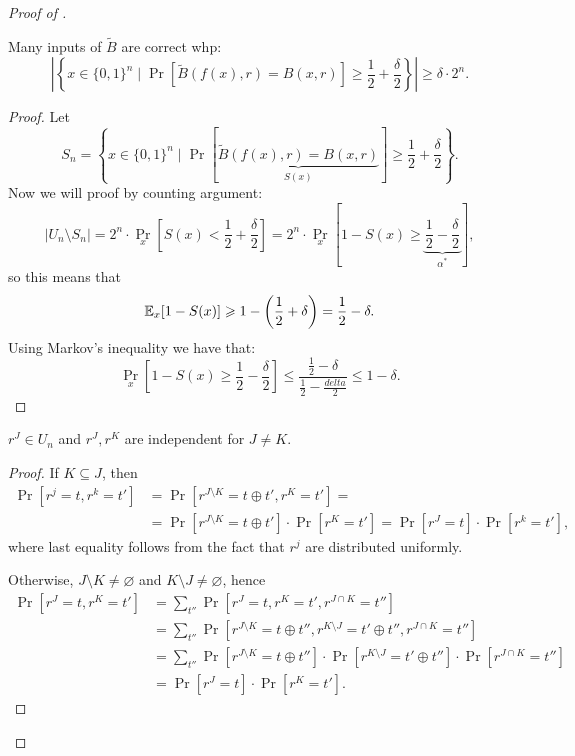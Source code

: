 \begin{proof}[Proof of ]
   \begin{lemma}
    Many inputs of $\tilde B$ are correct whp:
	 \[
		 \left|\left\{x \in \{0,1\}^n \mid \Pr[\tilde B(f(x), r) = B(x, r)] \geq \frac{1}{2} + \frac{\delta}{2}\right\}\right| \geq \delta \cdot 2^n.
	\] 
  \end{lemma}
  \begin{proof}
	  Let 
	  \[
		  S_n = \left\{x \in \{0,1\}^n \mid \Pr\left[\underbrace{\tilde B(f(x), r) = B(x, r)}_{S(x)}\right] \geq \frac{1}{2} + \frac{\delta}{2}\right\}.
	  \] 
	  Now we will proof by counting argument:
    \[
		|U_n \setminus S_n| = 2 ^{n} \cdot \Pr_x \left[S(x) < \frac{1}{2} + \frac{\delta}{2}\right] = 2^{n} \cdot \Pr_x \left[1 - S(x) \geq \underbrace{\frac{1}{2} - \frac{\delta}{2}}_{\alpha^*}\right],
    \] 
	so this means that
	\[
		\mathbb{E}_x[1 - S(x)] \geqslant 1 - \left(\frac{1}{2} + \delta\right) = \frac{1}{2} - \delta.
	\] 
	Using Markov's inequality we have that:
	\[
		\Pr_x \left[1 - S(x) \geq \frac{1}{2} - \frac{\delta}{2}\right] \leq \frac{\frac{1}{2} - \delta}{\frac{1}{2} - \frac{delta}{2}} \leq 1 - \delta.
	\] 
  \end{proof}

  \begin{lemma}
    $r^J \in U_n$ and  $r^J, r^K$ are independent for  $J \neq K$.
  \end{lemma}
  \begin{proof}
    If $K \subseteq J$, then
	 \begin{align*}
		 \Pr[r^j = t, r^k = t'] &= \Pr[r^{J \setminus K} = t \oplus t', r^{K} = t'] = \\
								&= \Pr[r^{J \setminus K} = t \oplus t'] \cdot \Pr[r^K = t'] = \Pr[r^J = t] \cdot \Pr[r^k = t'],
	 \end{align*} where last equality follows from the fact that $r^j$ are distributed uniformly. 

	 Otherwise, $J \setminus K \neq \varnothing$ and  $K \setminus J \neq \varnothing$, hence
	 \begin{align*}
		 \Pr[r^J = t, r^K = t'] &= \sum_{t''} \Pr[r^J = t, r^K = t', r^{J \cap K} = t''] \\
								&= \sum_{t''} \Pr[r^{J \setminus K} = t \oplus t'', r^{K \setminus J} = t' \oplus t'', r^{J \cap K} = t''] \\
								&= \sum_{t''} \Pr[r^{J \setminus K} = t \oplus t''] \cdot \Pr[r^{K \setminus J} = t' \oplus t''] \cdot \Pr[r^{J \cap K} = t''] \\
								&= \Pr[r^{J} = t] \cdot \Pr[r^{K} = t'].
	 \end{align*}
  \end{proof}


\end{proof}
